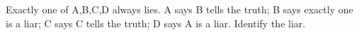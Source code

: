 Exactly one of A,B,C,D always lies. A says B tells the truth; B says exactly one is a liar; C says C tells the truth; D says A is a liar. Identify the liar.
